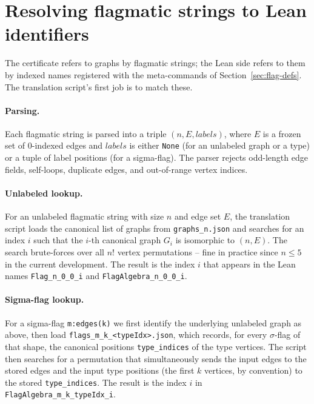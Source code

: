 \documentclass[11pt]{article}
\begin{document}
\section{Resolving flagmatic strings to Lean identifiers}
\label{sec:mapping}

The certificate refers to graphs by flagmatic strings; the Lean side
refers to them by indexed names registered with the meta-commands of
Section~\ref{sec:flag-defs}. The translation script's first job is to
match these.

\paragraph{Parsing.}
Each flagmatic string is parsed into a triple
$(n, E, \mathit{labels})$, where $E$ is a frozen set of $0$-indexed
edges and $\mathit{labels}$ is either \texttt{None} (for an unlabeled
graph or a type) or a tuple of label positions (for a sigma-flag). The
parser rejects odd-length edge fields, self-loops, duplicate edges, and
out-of-range vertex indices.

\paragraph{Unlabeled lookup.}
For an unlabeled flagmatic string with size $n$ and edge set $E$, the
translation script loads the canonical list of graphs from
\texttt{graphs\_n.json} and searches for an index $i$ such that the
$i$-th canonical graph $G_i$ is isomorphic to $(n, E)$. The search
brute-forces over all $n!$ vertex permutations -- fine in practice since
$n \le 5$ in the current development. The result is the index $i$ that
appears in the Lean names \texttt{Flag\_n\_0\_0\_i} and
\texttt{FlagAlgebra\_n\_0\_0\_i}.

\paragraph{Sigma-flag lookup.}
For a sigma-flag \texttt{m:edges(k)} we first identify the underlying
unlabeled graph as above, then load
\texttt{flags\_m\_k\_<typeIdx>.json}, which records, for every
$\sigma$-flag of that shape, the canonical positions
\texttt{type\_indices} of the type vertices. The script then searches
for a permutation that simultaneously sends the input edges to the
stored edges and the input type positions (the first $k$ vertices, by
convention) to the stored \texttt{type\_indices}. The result is the
index $i$ in \texttt{FlagAlgebra\_m\_k\_typeIdx\_i}.
\end{document}
